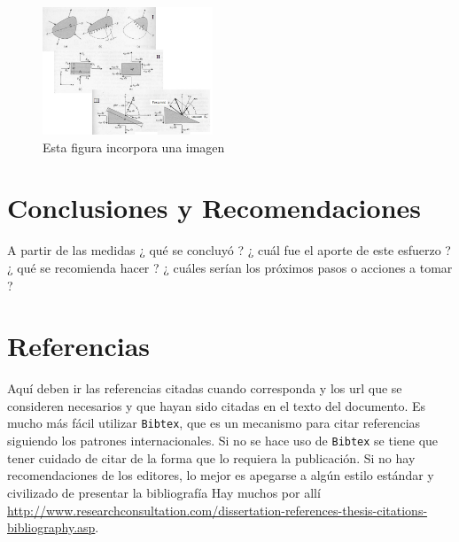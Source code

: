 \documentclass[notitlepage,letterpaper,12pt]{article} %
\begin{document}
\begin{figure}
\begin{center}
\includegraphics[width=2in]{figs/FigTensorEsfuerzos2D.jpg} %
\caption{Esta figura incorpora una imagen}
\label{Figura1} %
\end{center}
\end{figure}


\section{Conclusiones y Recomendaciones}
A partir de las medidas ¿ qué se concluyó ? ¿ cuál fue el aporte de este esfuerzo ? ¿ qué se recomienda hacer ? ¿ cuáles serían los próximos pasos o acciones a tomar ?

\section{Referencias}
Aquí deben ir las referencias citadas \cite{Narasimhan1993} cuando corresponda y los url que se consideren necesarios y que hayan sido citadas en el texto del documento. Es mucho más fácil utilizar \texttt{Bibtex}, que es un mecanismo para citar referencias siguiendo los patrones internacionales. Si no se hace uso de \texttt{Bibtex} se tiene que tener cuidado de citar de la forma que lo requiera la publicación. Si no hay recomendaciones de los editores, lo mejor es apegarse a algún estilo estándar y civilizado de presentar la bibliografía Hay muchos por allí \url{http://www.researchconsultation.com/dissertation-references-thesis-citations-bibliography.asp}.






\end{document}
